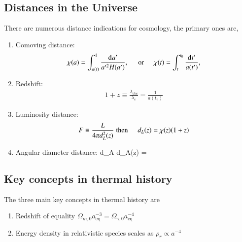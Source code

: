 \documentclass[a4paper, 12pt]{article}
\begin{document}
{\subsection{Distances in the Universe}%
  \label{sub:Distances in the Universe}
  There are numerous distance indications for cosmology, the primary
  ones are, 
  \begin{enumerate}
    \item[\circ] Comoving distance: 
    \begin{align}
      \label{comoving distance}
      \chi(a) = \int_{a(t)}^{1}
      \frac{\dd[]{a^{\prime}}}{a^{\prime 2} H(a^{\prime}) },
      \hspace{0.5cm}\mathrm{ or }\hspace{0.5cm} \chi(t) =
      \int_{t}^{t_0} \frac{\dd[]{t^{\prime}}}{a(t^{\prime})}, 
    \end{align}
    \item[\circ] Redshift:
    \begin{align}
      \label{redshift}
      1 + z \equiv \frac{\lambda_{\mathrm{obs}}}{\lambda_{e}} =
      \frac{1}{a(t_e)}
    \end{align}
    \item[\circ] Luminosity distance: 
    \begin{align}
      \label{luminosity distance}
      F \equiv \frac{L}{4 \pi d_{L}^{2}(z)} \hspace{0.1cm}
      \mathrm{then} \hspace{0.5cm} d_{L}(z) = \chi(z) (1 + z)
    \end{align}
    \item[\circ] Angular diameter distance: 
    d_{A} \equiv {} \hspace{0.1cm}
     \hspace{0.5cm} d_{A}(z) = 
  \end{enumerate}

  \subsection{Key concepts in thermal history}%
    \label{sub:Key concepts in thermal history}
    The three main key concepts in thermal history are 
    \begin{enumerate}
      \item[\circ] Redshift of equality \( \Omega_{m, 0}
      a_{\mathrm{eq}}^{-3} = \Omega_{\gamma, 0}
      a_{\mathrm{eq}}^{-4} \)
      \item[\circ] Energy density in relativistic species scales as
      \( \rho_r \propto a^{-4}  \)
    \end{enumerate}
    


}
\end{document}
